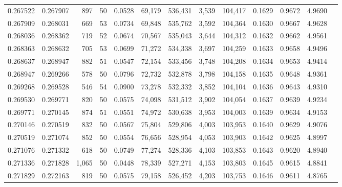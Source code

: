 \begin{tabular}{rrrrrrrrrrrrr}
0.267522 & 0.267907 &   897 &  50 &                                     0.0528 &  69,179 & 536,431 &   3,539 & 104,417 & 0.1629 & 0.9672 & 4.9690 \\
0.267909 & 0.268031 &   669 &  53 &                                     0.0734 &  69,848 & 535,762 &   3,592 & 104,364 & 0.1630 & 0.9667 & 4.9628 \\
0.268036 & 0.268362 &   719 &  52 &                                     0.0674 &  70,567 & 535,043 &   3,644 & 104,312 & 0.1632 & 0.9662 & 4.9561 \\
0.268363 & 0.268632 &   705 &  53 &                                     0.0699 &  71,272 & 534,338 &   3,697 & 104,259 & 0.1633 & 0.9658 & 4.9496 \\
0.268637 & 0.268947 &   882 &  51 &                                     0.0547 &  72,154 & 533,456 &   3,748 & 104,208 & 0.1634 & 0.9653 & 4.9414 \\
0.268947 & 0.269266 &   578 &  50 &                                     0.0796 &  72,732 & 532,878 &   3,798 & 104,158 & 0.1635 & 0.9648 & 4.9361 \\
0.269268 & 0.269528 &   546 &  54 &                                     0.0900 &  73,278 & 532,332 &   3,852 & 104,104 & 0.1636 & 0.9643 & 4.9310 \\
0.269530 & 0.269771 &   820 &  50 &                                     0.0575 &  74,098 & 531,512 &   3,902 & 104,054 & 0.1637 & 0.9639 & 4.9234 \\
0.269771 & 0.270145 &   874 &  51 &                                     0.0551 &  74,972 & 530,638 &   3,953 & 104,003 & 0.1639 & 0.9634 & 4.9153 \\
0.270146 & 0.270519 &   832 &  50 &                                     0.0567 &  75,804 & 529,806 &   4,003 & 103,953 & 0.1640 & 0.9629 & 4.9076 \\
0.270519 & 0.271074 &   852 &  50 &                                     0.0554 &  76,656 & 528,954 &   4,053 & 103,903 & 0.1642 & 0.9625 & 4.8997 \\
0.271076 & 0.271332 &   618 &  50 &                                     0.0749 &  77,274 & 528,336 &   4,103 & 103,853 & 0.1643 & 0.9620 & 4.8940 \\
0.271336 & 0.271828 & 1,065 &  50 &                                     0.0448 &  78,339 & 527,271 &   4,153 & 103,803 & 0.1645 & 0.9615 & 4.8841 \\
0.271829 & 0.272163 &   819 &  50 &                                     0.0575 &  79,158 & 526,452 &   4,203 & 103,753 & 0.1646 & 0.9611 & 4.8765 \\

\end{tabular}
